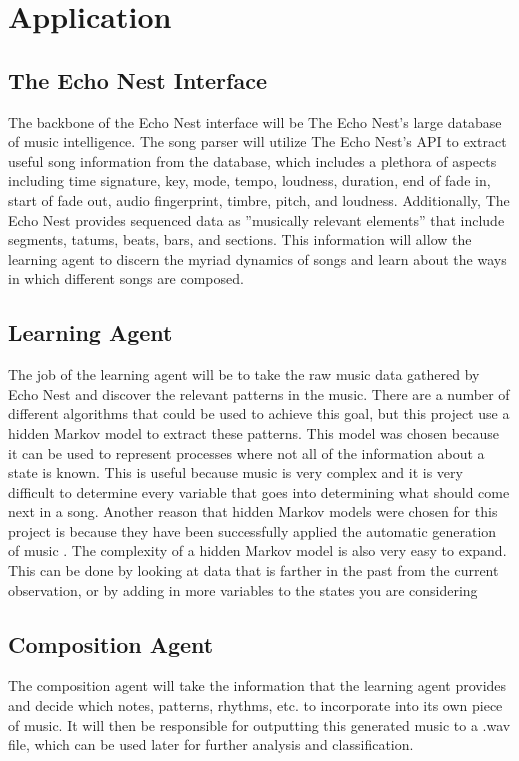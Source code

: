 \documentclass{article}
\begin{document}
\section{Application}
\subsection{The Echo Nest Interface}
The backbone of the Echo Nest interface will be The Echo Nest’s large database of music intelligence. The
song parser will utilize The Echo Nest’s API to extract useful song information from the database, which
includes a plethora of aspects including time signature, key, mode, tempo, loudness, duration, end of fade
in, start of fade out, audio fingerprint, timbre, pitch, and loudness. Additionally, The Echo Nest provides
sequenced data as ”musically relevant elements” that include segments, tatums, beats, bars, and sections.
This information will allow the learning agent to discern the myriad dynamics of songs and learn about the
ways in which different songs are composed.

\subsection{Learning Agent}
The job of the learning agent will be to take the raw music data gathered by Echo Nest and discover the
relevant patterns in the music. There are a number of different algorithms that could be used to achieve this
goal, but this project use a  hidden Markov model to extract these patterns. This model was chosen because
it can be used to represent processes where not all of the information about a state is known. This is useful
because music is very complex and it is very difficult to determine every variable that goes into determining
what should come next in a song. Another reason that hidden Markov models were chosen for this project
is because they have been successfully applied the automatic generation of music \cite{5492670}.
The complexity of a hidden Markov model is also very easy to expand. This can be done by looking at data that is farther in
the past from the current observation, or by adding in more variables to the states you are considering

\subsection{Composition Agent}
The composition agent will take the information that the learning agent provides and decide which notes,
patterns, rhythms, etc. to incorporate into its own piece of music. It will then be responsible for outputting
this generated music to a .wav file, which can be used later for further analysis and classification.
\end{document}
